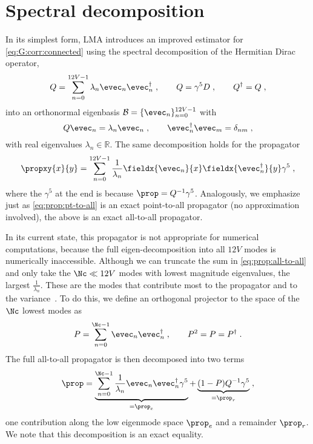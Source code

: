 \section{Spectral decomposition}
\label{sec:lma:prop:decomp}

In its simplest form, LMA introduces an improved estimator for \cref{eq:G:corr:connected} using the spectral decomposition of the Hermitian Dirac operator,
\begin{equation}
Q = \sum_{n=0}^{12V-1} \lambda_{n} \evec_{n} \evec_{n}^{\dagger} \;,
\qquad
Q = \gamma^{5} D \;,
\qquad
Q^{\dagger} = Q \;,
\end{equation}
into an orthonormal eigenbasis $\mathcal{B} = \{ \evec_n \}_{n=0}^{12V-1}$ with
\begin{equation}
Q \evec_{n} = \lambda_{n} \evec_{n} \;,
\qquad
\evec_{n}^{\dagger} \evec_{m} = \delta_{nm} \;,
\end{equation}
with real eigenvalues $\lambda_{n} \in \mathbb{R}$.
The same decomposition holds for the propagator
\begin{equation} \label{eq:prop:all-to-all}
\propxy{x}{y} = \sum_{n=0}^{12V-1} \frac{1}{\lambda_{n}} \fieldx{\evec_{n}}{x} \fieldx{\evec_{n}^{\dagger}}{y} \gamma^{5} \;,
\end{equation}
where the $\gamma^{5}$ at the end is because $\prop = Q^{-1} \gamma^{5}$.
Analogously, we emphasize just as \cref{eq:prop:pt-to-all} is an exact point-to-all propagator (no approximation involved), the above is an exact all-to-all propagator.

In its current state, this propagator is not appropriate for numerical computations, because the full eigen-decomposition into all $12V$ modes is numerically inaccessible.
Although we can truncate the sum in \cref{eq:prop:all-to-all} and only take the $\Nc \ll 12 V$ modes with lowest magnitude eigenvalues, \ie the largest $\frac{1}{\lambda_{n}}$.
These are the modes that contribute most to the propagator and to the variance~\cite{DeGrand_2004}.
To do this, we define an orthogonal projector to the space of the $\Nc$ lowest modes as
\begin{equation} \label{eq:lma:projector}
P = \sum_{n=0}^{\Nc-1} \evec_n \evec_n^{\dagger} \;,
\qquad
P^{2} = P = P^{\dagger} \;.
\end{equation}
The full all-to-all propagator is then decomposed into two terms
\begin{equation} \label{eq:prop:lma}
\prop
= \underbrace{\sum_{n=0}^{\Nc-1}
  \frac{1}{\lambda_{n}} \evec_{n} \evec_{n}^{\dagger} \gamma^{5}}_{=\prop_e}
+ \underbrace{(1-P) Q^{-1} \gamma^{5}}_{=\prop_r} \;,
\end{equation}
one contribution along the low eigenmode space $\prop_e$ and a remainder $\prop_r$.
We note that this decomposition is an exact equality.

